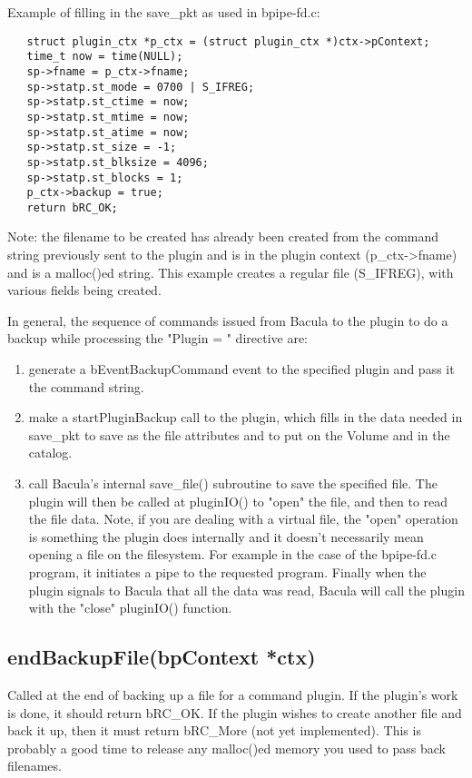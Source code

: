 Example of filling in the save\_pkt as used in bpipe-fd.c:

\begin{verbatim}
   struct plugin_ctx *p_ctx = (struct plugin_ctx *)ctx->pContext;
   time_t now = time(NULL);
   sp->fname = p_ctx->fname;
   sp->statp.st_mode = 0700 | S_IFREG;
   sp->statp.st_ctime = now;
   sp->statp.st_mtime = now;
   sp->statp.st_atime = now;
   sp->statp.st_size = -1;
   sp->statp.st_blksize = 4096;
   sp->statp.st_blocks = 1;
   p_ctx->backup = true;
   return bRC_OK;
\end{verbatim}

Note: the filename to be created has already been created from the
command string previously sent to the plugin and is in the plugin
context (p\_ctx->fname) and is a malloc()ed string.  This example
creates a regular file (S\_IFREG), with various fields being created.

In general, the sequence of commands issued from Bacula to the plugin
to do a backup while processing the "Plugin = " directive are:

\begin{enumerate}
 \item generate a bEventBackupCommand event to the specified plugin
       and pass it the command string.
 \item make a startPluginBackup call to the plugin, which
       fills in the data needed in save\_pkt to save as the file
       attributes and to put on the Volume and in the catalog.
 \item call Bacula's internal save\_file() subroutine to save the specified
       file.  The plugin will then be called at pluginIO() to "open"
       the file, and then to read the file data.
       Note, if you are dealing with a virtual file, the "open" operation
       is something the plugin does internally and it doesn't necessarily
       mean opening a file on the filesystem.  For example in the case of
       the bpipe-fd.c program, it initiates a pipe to the requested program.
       Finally when the plugin signals to Bacula that all the data was read,
       Bacula will call the plugin with the "close" pluginIO() function.
\end{enumerate}


\subsection{endBackupFile(bpContext *ctx)}
Called at the end of backing up a file for a command plugin.  If the plugin's
work is done, it should return bRC\_OK.  If the plugin wishes to create another
file and back it up, then it must return bRC\_More (not yet implemented).  This
is probably a good time to release any malloc()ed memory you used to pass back
filenames.

